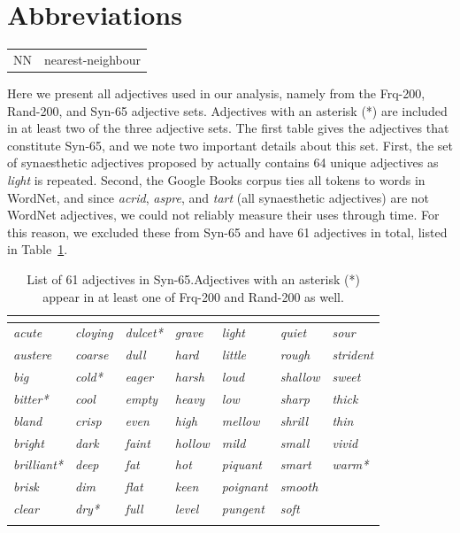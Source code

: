 \documentclass[output=paper]{langsci/langscibook}
\begin{document}
\section*{Abbreviations}
\begin{tabularx}{\textwidth}{@{}lQ@{}}
NN & nearest-neighbour
\end{tabularx}



Here we present all adjectives used in our analysis, namely from the {\sc Frq-200}, {\sc Rand-200}, and {\sc Syn-65} adjective sets.
Adjectives with an asterisk (*) are included in at least two of the three adjective sets.
The first table gives the adjectives that constitute {\sc Syn-65}, and we note two important details about this set.
First, the set of synaesthetic adjectives proposed by \citet{williams1976} actually contains 64 unique adjectives as {\it light} is repeated.
Second, the Google Books corpus ties all tokens to words in WordNet, and since {\it acrid}, {\it aspre}, and {\it tart} (all synaesthetic adjectives) are not WordNet adjectives, we could not reliably measure their uses through time.
For this reason, we excluded these from {\sc Syn-65} and have 61 adjectives in total, listed in Table~\ref{tab:synadjs}.

\begin{table}\footnotesize
\caption{List of 61 adjectives in {\sc Syn-65}.\label{tab:synadjs}
Adjectives with an asterisk (*) appear in at least one of {\sc Frq-200} and {\sc Rand-200} as well.}
\begin{tabular}{ *{7}{>{\itshape}l} }
\lsptoprule
\multicolumn{7}{c}{\normalfont\scshape Syn-65}\\
\midrule
acute & cloying & dulcet* & grave & light & quiet & sour \\
austere & coarse & dull & hard & little & rough & strident \\
big & cold* & eager & harsh & loud & shallow & sweet \\
bitter* & cool & empty & heavy & low & sharp & thick \\
bland & crisp & even & high & mellow & shrill & thin \\
bright & dark & faint & hollow & mild & small & vivid \\
brilliant* & deep & fat & hot & piquant & smart & warm* \\
brisk & dim & flat & keen & poignant & smooth & \\
clear & dry* & full & level & pungent & soft & \\
\lspbottomrule
\end{tabular}
\end{table}
\end{document}
